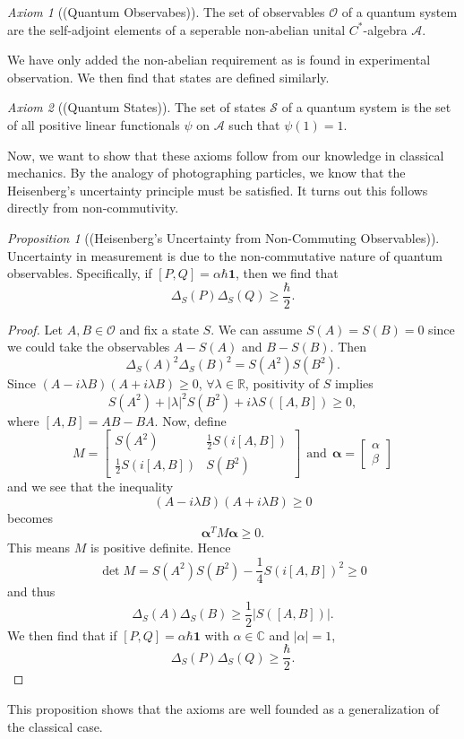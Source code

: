 \documentclass[leqno]{article}
\theoremstyle{definition}
\theoremstyle{remark}
\theoremstyle{theorem}
\newtheorem{proposition}{Proposition}
\newtheorem{axiom}{Axiom}
\newcommand{\R}{\mathbb{R}}
\newcommand{\A}{\mathcal{A}}
\newcommand{\C}{\mathbb{C}}
\newcommand{\opO}{\mathcal{O}}
\newcommand{\states}{\mathcal{S}}
\begin{document}
\begin{axiom}[(Quantum Observabes)]
The set of observables $\opO$ of a quantum system are the self-adjoint elements of a seperable non-abelian unital $C^*$-algebra $\A$.
\end{axiom}

We have only added the non-abelian requirement as is found in experimental observation.  We then find that states are defined similarly.

\begin{axiom}[(Quantum States)]
The set of states $\states$ of a quantum system is the set of all positive linear functionals $\psi$ on $\A$ such that $\psi(1)=1$.
\end{axiom}

Now, we want to show that these axioms follow from our knowledge in classical mechanics.  By the analogy of photographing particles, we know that the Heisenberg's uncertainty principle must be satisfied.  It turns out this follows directly from non-commutivity.

\begin{proposition}[(Heisenberg's Uncertainty from Non-Commuting Observables)]
Uncertainty in measurement is due to the non-commutative nature of quantum observables.  Specifically, if $[P,Q]=\alpha \hbar \mathbf{1}$, then we find that
\[
\Delta_S(P)\Delta_S(Q)\geq \frac{\hbar}{2}.
\]
\end{proposition} 

\begin{proof}
	Let $A,B\in \opO$ and fix a state $S$.  We can assume $S(A)=S(B)=0$ since we could take the observables $A-S(A)$ and $B-S(B)$. Then 
	\[
	\Delta_S(A)^2\Delta_S(B)^2=S(A^2)S(B^2).
	\]
	Since $(A-i\lambda B)(A+i\lambda B)\geq 0$, $\forall \lambda \in \R$, positivity of $S$ implies
	\[
	S(A^2)+|\lambda|^2 S(B^2)+i\lambda S([A,B])\geq 0,
	\]
	where $[A,B]=AB-BA$. Now, define 
	\[
	M=\begin{bmatrix}
	S(A^2) & \frac{1}{2} S(i[A,B])\\
	\frac{1}{2} S(i[A,B]) & S(B^2)
	\end{bmatrix}
	~~ \textrm{and} ~~ \mathbf{\alpha}=\begin{bmatrix}
	\alpha\\
	\beta
	\end{bmatrix}
	\]
	and we see that the inequality
	\[
	(A-i\lambda B)(A+i\lambda B)\geq 0
	\]
	becomes 
	\[
	\mathbf{\alpha}^T M \mathbf{\alpha}\geq 0.
	\]
	This means $M$ is positive definite. Hence
	\[
	\det M = S(A^2)S(B^2)-\frac{1}{4}S(i[A,B])^2\geq 0
	\]
	and thus
	\[
	\Delta_S(A)\Delta_S(B)\geq \frac{1}{2} |S([A,B])|.
	\]
	We then find that if $[P,Q]=\alpha \hbar \mathbf{1}$ with $\alpha \in \C$ and $|\alpha|=1$,
	\[
	\Delta_S(P)\Delta_S(Q)\geq \frac{\hbar}{2}.
	\]
	\end{proof}
This proposition shows that the axioms are well founded as a generalization of the classical case. 
\end{document}
